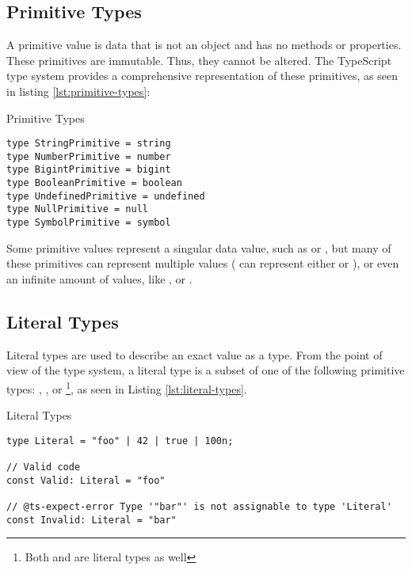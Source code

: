 \subsection{Primitive Types}

A primitive value is data that is not an object and has no methods or properties. These primitives are immutable. Thus, they cannot be altered. The TypeScript type system provides a comprehensive representation of these primitives, as seen in listing \ref{lst:primitive-types}:

\begin{listing}[ht]
  \caption{Primitive Types}\label{lst:primitive-types}
  \begin{verbatim}
type StringPrimitive = string
type NumberPrimitive = number
type BigintPrimitive = bigint
type BooleanPrimitive = boolean
type UndefinedPrimitive = undefined
type NullPrimitive = null
type SymbolPrimitive = symbol
\end{verbatim}
\end{listing}

Some primitive values represent a singular data value, such as  or , but many of these primitives can represent multiple values ( can represent either  or ), or even an infinite amount of values, like ,  or .

\subsection{Literal Types}

Literal types are used to describe an exact value as a type. From the point of view of the type system, a literal type is a subset of one of the following primitive types: , ,  or \footnote{Both  and  are literal types as well}, as seen in Listing \ref{lst:literal-types}.

\begin{listing}[ht]
  \caption{Literal Types}\label{lst:literal-types}
  \begin{verbatim}
type Literal = "foo" | 42 | true | 100n;

// Valid code
const Valid: Literal = "foo"

// @ts-expect-error Type '"bar"' is not assignable to type 'Literal'
const Invalid: Literal = "bar" 
\end{verbatim}
\end{listing}

